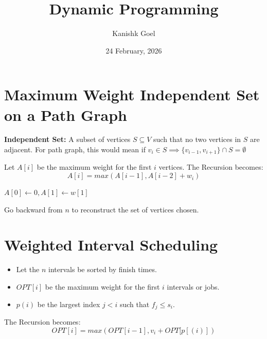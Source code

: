 \documentclass{article}
\title{Dynamic Programming}
\author{Kanishk Goel}
\date{24 February, 2026}
\begin{document}
	\SetAlgoCaptionSeparator{}
	\renewcommand{\thealgocf}{} 
	\renewcommand{\AlCapNameFnt}{\bfseries}
	\renewcommand{\AlCapFnt}{}
	\DontPrintSemicolon
	\renewcommand{\algorithmcfname}{}
	\maketitle
	\SetAlgoNoEnd
	\section{Maximum Weight Independent Set on a Path Graph}
	
	\textbf{Independent Set:} A subset of vertices $S \subseteq V$ such that no two vertices in $S$ are adjacent. For path graph, this would mean if $v_i \in S \implies \{v_{i-1}, v_{i+1}\} \cap S = \emptyset$
	\vspace{3mm}
	
	\begin{algorithm}[H]
		\SetAlgoLined
		\caption{Problem: MWIS in path graph}
	\end{algorithm}
	\vspace{5mm}
	
	Let $A[i]$ be the maximum weight for the first $i$ vertices. The Recursion becomes:
	\[A[i] = max(A[i-1],A[i-2] + w_i)\]
	
	\begin{algorithm}[H]
		\SetAlgoLined
		\caption{Solution}
		$A[0] \leftarrow 0, A[1] \leftarrow w[1]$ \;
	\end{algorithm}
	\vspace{2mm}
	Go backward from $n$ to reconstruct the set of vertices chosen.
	
	\section{Weighted Interval Scheduling}
	\begin{algorithm}[H]
		\SetAlgoLined
		\caption{Problem: Weighted Interval Scheduling}
	\end{algorithm}	
	\vspace{5mm}
	\begin{itemize}
		\item Let the $n$ intervals be sorted by finish times.
		\item $OPT[i]$ be the maximum weight for the first $i$ intervals or jobs.
		\item $p(i)$ be the largest index $j < i$ such that $f_j \leq s_i$.
	\end{itemize}
	The Recursion becomes:
	\[OPT[i] = max(OPT[i-1], v_i + OPT[p[(i)])\]
	
\end{document}
